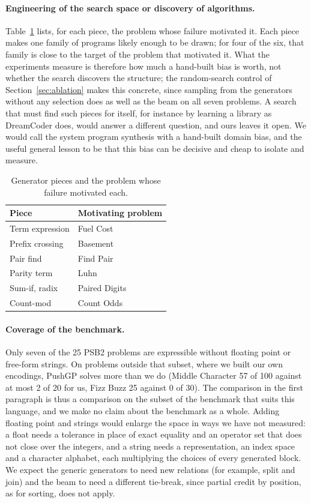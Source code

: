 \documentclass[sigconf,nonacm]{acmart}
\begin{document}
\paragraph{Engineering of the search space or discovery of algorithms.}
Table~\ref{tab:pieces} lists, for each piece, the problem whose failure motivated it. Each piece makes one family of programs likely enough to be drawn; for four of the six, that family is close to the target of the problem that motivated it. What the experiments measure is therefore how much a hand-built bias is worth, not whether the search discovers the structure; the random-search control of Section~\ref{sec:ablation} makes this concrete, since sampling from the generators without any selection does as well as the beam on all seven problems. A search that must find such pieces for itself, for instance by learning a library as DreamCoder does, would answer a different question, and ours leaves it open. We would call the system program synthesis with a hand-built domain bias, and the useful general lesson to be that this bias can be decisive and cheap to isolate and measure.

\begin{table}[t]
  \caption{Generator pieces and the problem whose failure motivated each.}
  \label{tab:pieces}
  \begin{tabular}{ll}
    \toprule
    Piece & Motivating problem \\
    \midrule
    Term expression & Fuel Cost \\
    Prefix crossing & Basement \\
    Pair find & Find Pair \\
    Parity term & Luhn \\
    Sum-if, radix & Paired Digits \\
    Count-mod & Count Odds \\
    \bottomrule
  \end{tabular}
\end{table}

\paragraph{Coverage of the benchmark.}
Only seven of the 25 PSB2 problems are expressible without floating point or free-form strings. On problems outside that subset, where we built our own encodings, PushGP
solves more than we do (Middle Character 57 of 100 against at most 2 of 20 for us, Fizz Buzz 25 against 0 of 30). The comparison in the first paragraph is thus a
comparison on the subset of the benchmark that suits this language, and we make no claim about the benchmark as a whole. Adding floating point and strings would enlarge the space in ways we have not measured: a float needs a tolerance in place of exact equality and an operator set that does not close over the integers, and a string needs a representation, an index space and a character alphabet, each multiplying the choices of every generated block. We expect the generic generators to need new relations (for example, split and join) and the beam to need a different tie-break, since partial credit by position, as for sorting, does not apply.
\end{document}
